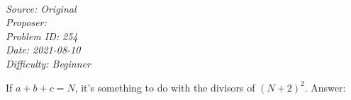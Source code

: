 \SSbreak\\
\emph{Source: Original}\\
\emph{Proposer: \Pnjoy}\\
\emph{Problem ID: 254}\\
\emph{Date: 2021-08-10}\\
\emph{Difficulty: Beginner}\\
\SSbreak

\bigskip

\begin{solution}\hfil\medskip
  
    If $a + b + c = N$, it's something to do with the divisors of $(N + 2)^2$. Answer: \fbox{}
\end{solution}\bigskip
